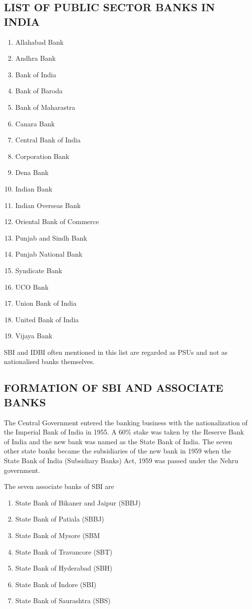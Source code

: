 \documentclass[a4paper, 14pt]{extarticle}
\begin{document}
{\subsection{LIST OF PUBLIC SECTOR BANKS IN INDIA}
\begin{enumerate}
\item Allahabad Bank
\item Andhra Bank
\item Bank of India
\item Bank of Baroda
\item Bank of Maharastra
\item Canara Bank
\item Central Bank of India
\item Corporation Bank
\item Dena Bank
\item Indian Bank
\item Indian Overseas Bank
\item Oriental Bank of Commerce
\item Punjab and Sindh Bank
\item Punjab National Bank
\item Syndicate Bank
\item UCO Bank
\item Union Bank of India
\item United Bank of India
\item Vijaya Bank
\end{enumerate}
\par SBI and IDBI often mentioned in this list are regarded as PSUs and not as nationalised banks themselves.

\subsection{FORMATION OF SBI AND ASSOCIATE BANKS}
\par The Central Government entered the banking business with the nationalization of the Imperial Bank of India in 1955. A 60\% stake was taken by the Reserve Bank of India and the new bank was named as the State Bank of India. The seven other state banks became the subsidiaries of the new bank in 1959 when the State Bank of India (Subsidiary Banks) Act, 1959 was passed under the Nehru government.

The seven associate banks of SBI are
\begin{enumerate}
\item State Bank of Bikaner and Jaipur (SBBJ)
\item State Bank of Patiala (SBBJ)
\item State Bank of Mysore (SBM
\item State Bank of Travancore (SBT)
\item State Bank of Hyderabad (SBH)
\item State Bank of Indore (SBI)
\item State Bank of Saurashtra (SBS)
\end{enumerate}

}
\end{document}
